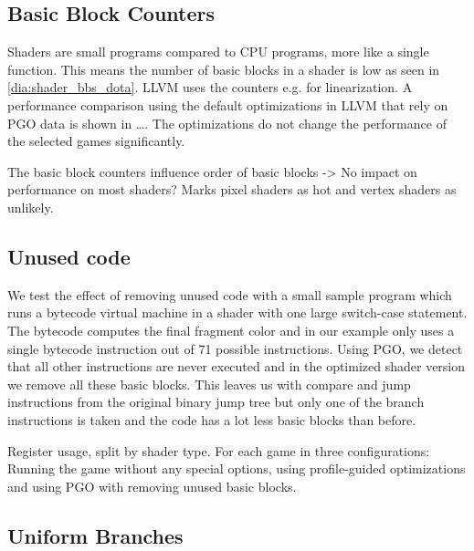 \clearpage
{}

\subsection{Basic Block Counters}
\label{sub:eval_counters}
Shaders are small programs compared to CPU programs, more like a single function. This means the number of basic blocks in a shader is low as seen in \cref{dia:shader_bbs_dota}.
LLVM uses the counters e.g. for linearization. A performance comparison using the default optimizations in LLVM that rely on PGO data is shown in \dots. The optimizations do not change the performance of the selected games significantly.

The basic block counters influence order of basic blocks -> No impact on performance on most shaders?
Marks pixel shaders as hot and vertex shaders as unlikely.




\subsection{Unused code}
\label{sub:eval_unused}
We test the effect of removing unused code with a small sample program which runs a bytecode virtual machine in a shader with one large switch-case statement.
The bytecode computes the final fragment color and in our example only uses a single bytecode instruction out of 71 possible instructions.
Using PGO, we detect that all other instructions are never executed and in the optimized shader version we remove all these basic blocks.
This leaves us with compare and jump instructions from the original binary jump tree but only one of the branch instructions is taken and the code has a lot less basic blocks than before.





Register usage, split by shader type.
For each game in three configurations: Running the game without any special options, using profile-guided optimizations and using PGO with removing unused basic blocks.




\subsection{Uniform Branches}
\label{sub:eval_uniform_branches}

